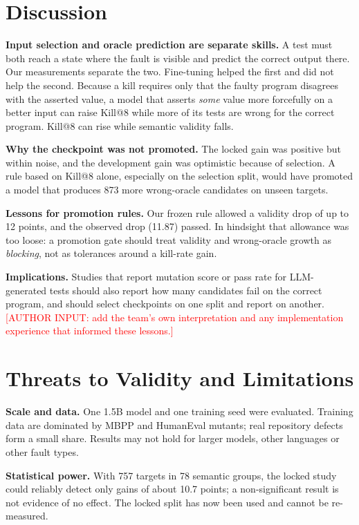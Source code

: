 \documentclass[conference,a4paper]{IEEEtran}
\makeatletter
\newcommand{\killk}[1]{Kill@#1}
\newcommand{\authorinput}[1]{\textcolor{red}{[AUTHOR INPUT: #1]}}
\makeatother
\begin{document}
\section{Discussion}

\textbf{Input selection and oracle prediction are separate skills.} A test must both
reach a state where the fault is visible and predict the correct output there. Our
measurements separate the two. Fine-tuning helped the first and did not help the
second. Because a kill requires only that the faulty program disagrees with the
asserted value, a model that asserts \emph{some} value more forcefully on a better
input can raise \killk{8} while more of its tests are wrong for the correct program.
\killk{8} can rise while semantic validity falls.

\textbf{Why the checkpoint was not promoted.} The locked gain was positive but within
noise, and the development gain was optimistic because of selection. A rule based on
\killk{8} alone, especially on the selection split, would have promoted a model that
produces 873 more wrong-oracle candidates on unseen targets.

\textbf{Lessons for promotion rules.} Our frozen rule allowed a validity drop of up to
12 points, and the observed drop (11.87) passed. In hindsight that allowance was too
loose: a promotion gate should treat validity and wrong-oracle growth as
\emph{blocking}, not as tolerances around a kill-rate gain.

\textbf{Implications.} Studies that report mutation score or pass rate for
LLM-generated tests should also report how many candidates fail on the correct
program, and should select checkpoints on one split and report on another.
\authorinput{add the team's own interpretation and any implementation experience
that informed these lessons.}

\section{Threats to Validity and Limitations}
\label{sec:threats}

\textbf{Scale and data.} One 1.5B model and one training seed were evaluated. Training
data are dominated by MBPP and HumanEval mutants; real repository defects form a
small share. Results may not hold for larger models, other languages or other fault
types.

\textbf{Statistical power.} With 757 targets in 78 semantic groups, the locked study
could reliably detect only gains of about 10.7 points; a non-significant result is not
evidence of no effect. The locked split has now been used and cannot be re-measured.
\end{document}
